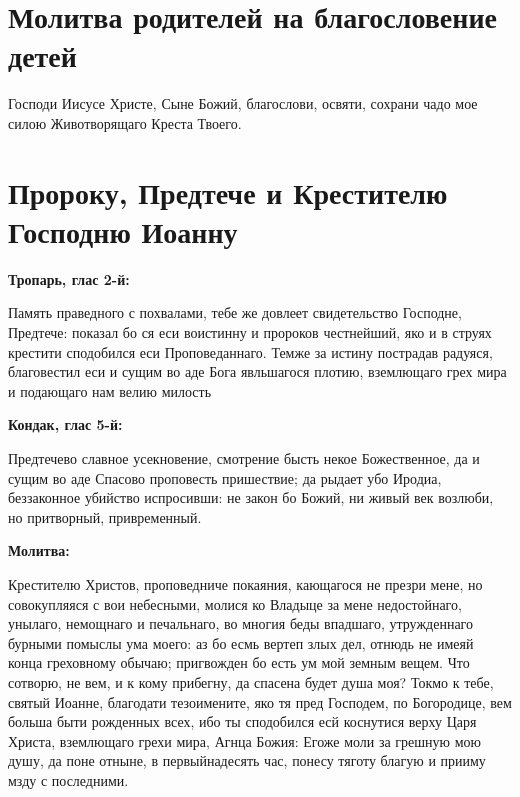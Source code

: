 {\newpage\noparindent\begin{minipage}{\textwidth}
\section{Молитва родителей на благословение детей}

\restoreparindent
Господи Иисусе Христе, Сыне Божий, благослови, освяти, сохрани чадо мое силою Животворящаго Креста Твоего.

\vspace{10\baselineskip}

\end{minipage}}

\section{Пророку, Предтече и Крестителю Господню Иоанну}
 
\bfseries Тропарь, глас 2-й:\normalfont{}\nopagebreak


Память праведного с похвалами, тебе же довлеет свидетельство Господне, Предтече: показал бо ся еси воистинну и пророков честнейший, яко и в струях крестити сподобился еси Проповеданнаго. Темже за истину пострадав радуяся, благовестил еси и сущим во аде Бога явльшагося плотию, вземлющаго грех мира и подающаго нам велию милость


\medskip
\bfseries Кондак, глас 5-й:\normalfont{}\nopagebreak


Предтечево славное усекновение, смотрение бысть некое Божественное, да и сущим во аде Спасово проповесть пришествие; да рыдает убо Иродиа, беззаконное убийство испросивши: не закон бо Божий, ни живый век возлюби, но притворный, привременный.


\medskip
\bfseries Молитва:\normalfont{}\nopagebreak


Крестителю Христов, проповедниче покаяния, кающагося не презри мене, но совокупляяся с вои небесными, молися ко Владыце за мене недостойнаго, унылаго, немощнаго и печальнаго, во многия беды впадшаго, утружденнаго бурными помыслы ума моего: аз бо есмь вертеп злых дел, отнюдь не имеяй конца греховному обычаю; пригвожден бо есть ум мой земным вещем. Что сотворю, не вем, и к кому прибегну, да спасена будет душа моя? Токмо к тебе, святый Иоанне, благодати тезоимените, яко тя пред Господем, по Богородице, вем больша быти рожденных всех, ибо ты сподобился есй коснутися верху Царя Христа, вземлющаго грехи мира, Агнца Божия: Егоже моли за грешную мою душу, да поне отныне, в первыйнадесять час, понесу тяготу благую и прииму мзду с последними. 


